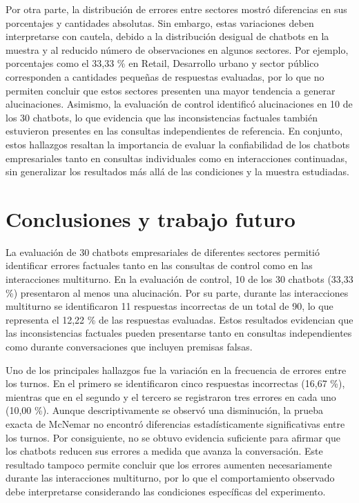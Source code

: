 \documentclass[manuscrito,spanish]{rcc}
\begin{document}
Por otra parte, la distribución de errores entre sectores mostró diferencias en sus porcentajes y cantidades absolutas. Sin embargo, estas variaciones deben interpretarse con cautela, debido a la distribución desigual de chatbots en la muestra y al reducido número de observaciones en algunos sectores. Por ejemplo, porcentajes como el 33,33 \% en Retail, Desarrollo urbano y sector público corresponden a cantidades pequeñas de respuestas evaluadas, por lo que no permiten concluir que estos sectores presenten una mayor tendencia a generar alucinaciones. Asimismo, la evaluación de control identificó alucinaciones en 10 de los 30 chatbots, lo que evidencia que las inconsistencias factuales también estuvieron presentes en las consultas independientes de referencia. En conjunto, estos hallazgos resaltan la importancia de evaluar la confiabilidad de los chatbots empresariales tanto en consultas individuales como en interacciones continuadas, sin generalizar los resultados más allá de las condiciones y la muestra estudiadas.

\section{Conclusiones y trabajo futuro}
La evaluación de 30 chatbots empresariales de diferentes sectores permitió identificar errores factuales tanto en las consultas de control como en las interacciones multiturno. En la evaluación de control, 10 de los 30 chatbots (33,33 \%) presentaron al menos una alucinación. Por su parte, durante las interacciones multiturno se identificaron 11 respuestas incorrectas de un total de 90, lo que representa el 12,22 \% de las respuestas evaluadas. Estos resultados evidencian que las inconsistencias factuales pueden presentarse tanto en consultas independientes como durante conversaciones que incluyen premisas falsas.

Uno de los principales hallazgos fue la variación en la frecuencia de errores entre los turnos. En el primero se identificaron cinco respuestas incorrectas (16,67 \%), mientras que en el segundo y el tercero se registraron tres errores en cada uno (10,00 \%). Aunque descriptivamente se observó una disminución, la prueba exacta de McNemar no encontró diferencias estadísticamente significativas entre los turnos. Por consiguiente, no se obtuvo evidencia suficiente para afirmar que los chatbots reducen sus errores a medida que avanza la conversación. Este resultado tampoco permite concluir que los errores aumenten necesariamente durante las interacciones multiturno, por lo que el comportamiento observado debe interpretarse considerando las condiciones específicas del experimento.
\end{document}
